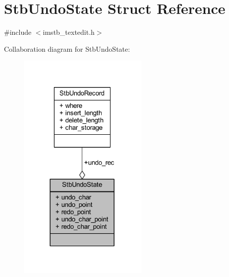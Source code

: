 \hypertarget{struct_stb_undo_state}{}\section{Stb\+Undo\+State Struct Reference}
\label{struct_stb_undo_state}


{\ttfamily \#include $<$imstb\+\_\+textedit.\+h$>$}



Collaboration diagram for Stb\+Undo\+State\+:
\nopagebreak
\begin{figure}[H]
\begin{center}
\leavevmode
\includegraphics[width=178pt]{struct_stb_undo_state__coll__graph}
\end{center}
\end{figure}

